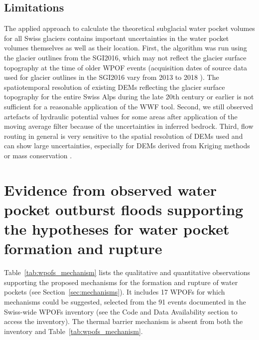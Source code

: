 \subsection{ Limitations}

The applied approach to calculate the theoretical subglacial water pocket volumes for all Swiss glaciers contains important uncertainties in the water pocket volumes themselves as well as their location. First, the algorithm was run using the glacier outlines from the SGI2016, which may not reflect the glacier surface topography at the time of older WPOF events (acquisition dates of source data used for glacier outlines in the SGI2016 vary from 2013 to 2018 \citep{Linsbauer&al2021}). The spatiotemporal resolution of existing DEMs reflecting the glacier surface topography for the entire Swiss Alps during the late 20th century or earlier \citep[e.g. in][]{Fischer&al2015} is not sufficient for a reasonable application of the WWF tool. Second, we still observed artefacts of hydraulic potential values for some areas after application of the moving average filter because of the uncertainties in inferred bedrock. Third, flow routing in general is very sensitive to the spatial resolution of DEMs used and can show large uncertainties, especially for DEMs derived from Kriging methods or mass conservation \citep{Mackie&al2021}.

\section{Evidence from observed water pocket outburst floods supporting the hypotheses for water pocket formation and rupture}
\label{Appendix:tableWPOFs}

Table~\ref{tab:wpofs_mechanism} lists the qualitative and quantitative observations supporting the proposed mechanisms for the formation and rupture of water pockets (see Section~\ref{sec:mechanisms}). It includes 17 WPOFs for which mechanisms could be suggested, selected from the 91 events documented in the Swiss-wide WPOFs inventory (see the Code and Data Availability section to access the inventory). The thermal barrier mechanism is absent from both the inventory and Table~\ref{tab:wpofs_mechanism}.

